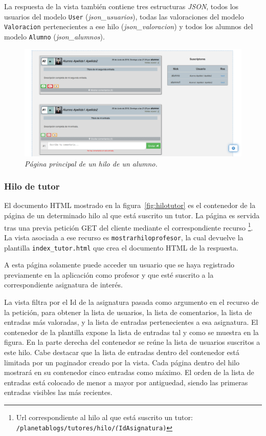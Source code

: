 \documentclass[a4paper, 12pt]{book}
\begin{document}
La respuesta de la vista tambi\'en contiene tres estructuras \textit{JSON}, todos los usuarios del modelo \texttt{User} (\textit{json\_usuarios}), 
todas las valoraciones del modelo \texttt{Valoracion} pertenecientes a ese hilo (\textit{json\_valoracion}) y todos los alumnos del modelo \texttt{Alumno} 
(\textit{json\_alumnos}).
\begin{figure}
  \centering
  \includegraphics[width=17cm, keepaspectratio]{imagenes/HiloAlumnoEntradas}
  \caption{\textit{P\'agina principal de un hilo de un alumno.}}
  \label{fig:hiloalumno}
\end{figure}


\subsubsection{Hilo de tutor} 
\label{sec:hilotutor}
El documento HTML mostrado en la figura~\ref{fig:hilotutor} es el contenedor de la p\'agina de un determinado hilo al que est\'a suscrito un tutor. 
La p\'agina es servida tras una previa petici\'on GET del cliente mediante el correspondiente recurso \footnote{Url correspondiente al hilo al que est\'a
suscrito un tutor: \texttt{/planetablogs/tutores/hilo/\textit(IdAsignatura)}}. La vista asociada a ese recurso es \texttt{mostrarhiloprofesor}, la cual 
devuelve la plantilla \texttt{index\_tutor.html} que crea el documento HTML de la respuesta.

A esta p\'agina solamente puede acceder un usuario que se haya registrado previamente en la aplicaci\'on como profesor y que est\'e suscrito a la
correspondiente asignatura de inter\'es.

La vista filtra por el Id de la asignatura pasada como argumento en el recurso de la petici\'on, para obtener la lista de 
usuarios, la lista de comentarios, la lista de entradas m\'as valoradas, y la lista de entradas pertenecientes a esa asignatura. 
El contenedor de la plantilla expone la lista de entradas tal y como se muestra en la figura. En la parte derecha del contenedor se re\'une la lista de 
usuarios suscritos a este hilo. Cabe destacar que la lista de entradas dentro del contenedor est\'a limitada por un paginador creado por la vista. Cada 
p\'agina dentro del hilo mostrar\'a en su contenedor cinco entradas como m\'aximo. El orden de la lista de entradas est\'a colocado de menor a mayor por 
antiguedad, siendo las primeras entradas visibles las m\'as recientes.
\end{document}
